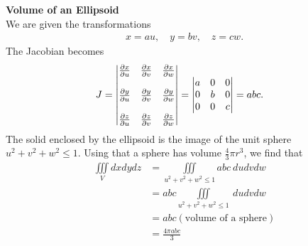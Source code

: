 \item %
\textbf{Volume of an Ellipsoid}\\
We are given the transformations  
\begin{align*}
  x=au, \quad y=bv, \quad z=cw.
\end{align*}
The Jacobian becomes 
\begin{align*}   J &=  
  \begin{vmatrix}
   \frac{\partial x}{\partial u} &  \frac{\partial x}{\partial v} & \frac{\partial x}{\partial w} \\\\
   \frac{\partial y}{\partial u} & \frac{\partial y}{\partial v} & \frac{\partial y}{\partial w} \\\\
   \frac{\partial z}{\partial u} & \frac{\partial z}{\partial v} & \frac{\partial z}{\partial w} 
  \end{vmatrix}
  =     
  \begin{vmatrix}
 a&0&0\\
 0&b&0\\
 0&0&c\\
  \end{vmatrix}
  = abc.
 \end{align*}
 The solid enclosed by the ellipsoid is the image of the unit sphere $u^2 + v^2 + w^2 \le 1$. Using that a sphere has volume $\frac{4}{3} \pi r^3$, we find that 
\begin{align*}
  \iiint\limits_{V} dxdydz
  &=  \iiint\limits_{u^2+v^2+w^2 \le 1} abc \ dudvdw \\
  &=  abc \iiint\limits_{u^2+v^2+w^2 \le 1} \ dudvdw \\
  &=  abc (\text{volume of a sphere}) \\
  &=   \frac{4\pi abc}{3} 
\end{align*}

